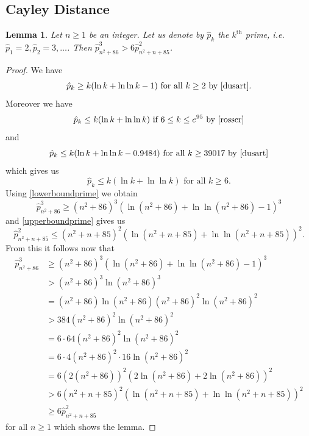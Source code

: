 \documentclass{article}
\newtheorem{lemma}{Lemma}
\begin{document}
\subsection{Cayley Distance}
\begin{lemma}\label{lemmaprimelargeenough}
Let $n \geq 1$ be an integer. Let us denote by $\hat{p}_k$ the $k^{\text{th}}$ prime, i.e. $\hat{p}_1 = 2, \hat{p}_2 = 3, \dots$. Then $\hat{p}_{n^2+86}^3 > 6\hat{p}_{n^2+n+85}^2$.
\end{lemma}
\begin{proof}
We have
\begin{equation}\label{lowerboundprime}
\hat{p}_k \geq k(\ln k+\ln\ln k-1) \text{ for all } k \geq 2 \text{ by \cite[Theorem~3]{dusart}}.
\end{equation}
Moreover we have
\begin{displaymath}
\hat{p}_k \leq k(\ln k + \ln\ln k) \text{ if } 6 \leq k \leq e^{95} \text{ by \cite[Theorem~28]{rosser}}
\end{displaymath}
and
\begin{displaymath}
\hat{p}_k \leq k(\ln k + \ln\ln k - 0.9484) \text{ for all } k \geq 39017 \text{ by \cite[Chapter~4]{dusart}}
\end{displaymath}
which gives us
\begin{equation}\label{upperboundprime}
\hat{p}_k \leq k(\ln k + \ln\ln k) \text{ for all } k \geq 6.
\end{equation}
Using \eqref{lowerboundprime} we obtain
\begin{displaymath}
\hat{p}_{n^2+86}^3 \geq (n^2+86)^3(\ln(n^2+86)+\ln\ln(n^2+86)-1)^3
\end{displaymath}
and \eqref{upperboundprime} gives us
\begin{displaymath}
\hat{p}_{n^2+n+85}^2 \leq (n^2+n+85)^2(\ln(n^2+n+85) + \ln\ln(n^2+n+85))^2.
\end{displaymath}
From this it follows now that
\begin{align*}
\hat{p}_{n^2+86}^3&\geq (n^2+86)^3(\ln(n^2+86)+\ln\ln(n^2+86)-1)^3\\
&> (n^2+86)^3\ln(n^2+86)^3\\
&= (n^2+86)\ln(n^2+86)(n^2+86)^2\ln(n^2+86)^2\\
&> 384(n^2+86)^2\ln(n^2+86)^2\\
&= 6 \cdot 64(n^2+86)^2\ln(n^2+86)^2\\
&= 6 \cdot 4(n^2+86)^2 \cdot 16\ln(n^2+86)^2\\
&= 6(2(n^2+86))^2(2\ln(n^2+86)+2\ln(n^2+86))^2\\
&> 6(n^2+n+85)^2(\ln(n^2+n+85)+\ln\ln(n^2+n+85))^2\\
& \geq 6\hat{p}_{n^2+n+85}^2
\end{align*}
for all $n \geq 1$ which shows the lemma.
\end{proof}
\end{document}
